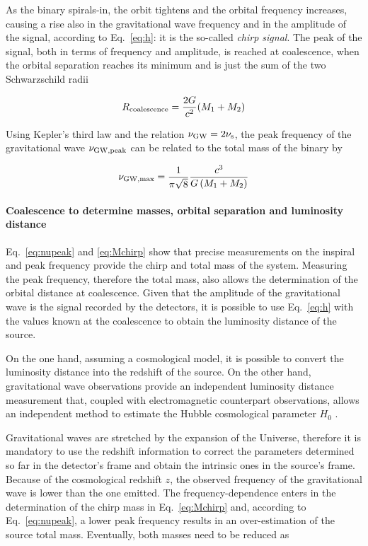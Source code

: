 \documentclass[a4paper,titlepage]{book}     	%
\begin{document}
As the binary spirals-in, the orbit tightens and the orbital frequency increases, causing a rise also in the gravitational wave frequency and in the amplitude of the signal, according to Eq.\ \ref{eq:h}: it is the so-called \emph{chirp signal}. The peak of the signal, both in terms of frequency and amplitude, is reached at coalescence, when the orbital separation reaches its minimum and is just the sum of the two Schwarzschild radii %

\begin{equation}\label{eq:Rcoalescence}
R_{\rm coalescence} = \frac{2G}{c^2} (M_1 + M_2)
\end{equation}

Using Kepler's third law and the relation $\nu_{\rm GW} = 2 \nu_{\rm s}$, the peak frequency of the gravitational wave $\nu_{\rm GW, peak}$ can be related to the total mass of the binary by


\begin{equation}\label{eq:nupeak}
	\nu_{\rm GW, max} = \frac{1}{\pi \sqrt{8}}\frac{c^3}{G\,{}(M_1+M_2)}
\end{equation}




\paragraph{Coalescence to determine masses, orbital separation and luminosity distance} Eq.\ \ref{eq:nupeak} and \ref{eq:Mchirp} show that precise measurements on the inspiral and peak frequency provide the chirp and total mass of the system. Measuring the peak frequency, therefore the total mass, also allows the determination of the orbital distance at coalescence. Given that the amplitude of the gravitational wave is the signal recorded by the detectors, it is possible to use Eq.\ \ref{eq:h} with the values known at the coalescence to obtain the luminosity distance of the source.


On the one hand, assuming a cosmological model, it is possible to convert the luminosity distance into the redshift of the source. On the other hand, gravitational wave observations provide an independent luminosity distance measurement that, coupled with electromagnetic counterpart observations, allows an independent method to estimate the Hubble cosmological parameter $H_0$ \cite{H0fromGW}.

Gravitational waves are stretched by the expansion of the Universe, therefore it is mandatory to use the redshift information to correct the parameters determined so far in the detector's frame and obtain the intrinsic ones in the source's frame. Because of the cosmological redshift $z$, the observed frequency of the gravitational wave is lower than the one emitted. The frequency-dependence enters in the determination of the chirp mass in Eq.\ \ref{eq:Mchirp} and, according to Eq.\ \ref{eq:nupeak}, a lower peak frequency results in an over-estimation of the source total mass. Eventually, both masses need to be reduced as
\end{document}
